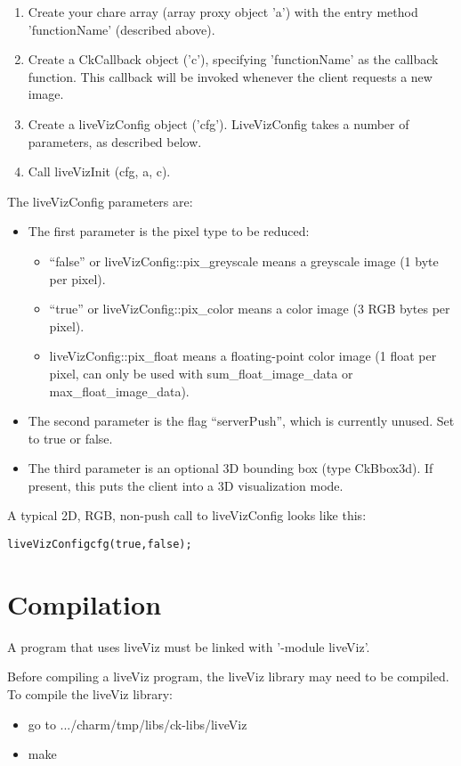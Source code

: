 \begin{enumerate}
\item Create your chare array (array proxy object 'a') with the entry 
      method 'functionName' (described above).
\item Create a CkCallback object ('c'), specifying 'functionName' as the 
      callback function.  This callback will be invoked whenever the
      client requests a new image.
\item Create a liveVizConfig object ('cfg').  LiveVizConfig takes a number
     of parameters, as described below.
\item Call liveVizInit (cfg, a, c).
\end{enumerate}

The liveVizConfig parameters are:
\begin{itemize}
  \item The first parameter is the pixel type to be reduced:
     \begin{itemize}
       \item ``false'' or liveVizConfig::pix\_greyscale means a greyscale image (1 byte per pixel).
       \item ``true'' or liveVizConfig::pix\_color means a color image (3 RGB bytes per pixel).
       \item liveVizConfig::pix\_float means a floating-point color image (1 float per pixel, can only be used with sum\_float\_image\_data or max\_float\_image\_data).
     \end{itemize}
   \item The second parameter is the flag ``serverPush'', which is currently unused. Set to true or false.     
   \item The third parameter is an optional 3D bounding box (type CkBbox3d).  If present, this puts the client into a 3D visualization mode.
\end{itemize}

A typical 2D, RGB, non-push call to liveVizConfig looks like this:
\begin{alltt}
   liveVizConfig cfg(true,false);
\end{alltt}

\section{Compilation}

A \charmpp{} program that uses liveViz must be linked with '-module liveViz'. 

Before compiling a liveViz program, the liveViz library may need to be compiled. 
To compile the liveViz library:
\begin{itemize}
\item go to .../charm/tmp/libs/ck-libs/liveViz
\item make
\end{itemize}


